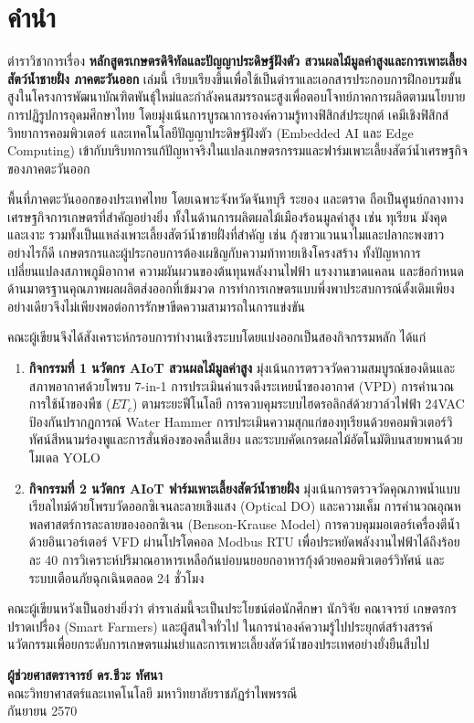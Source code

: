 \chapter*{คำนำ}

ตำราวิชาการเรื่อง \textbf{หลักสูตรเกษตรดิจิทัลและปัญญาประดิษฐ์ฝังตัว สวนผลไม้มูลค่าสูงและการเพาะเลี้ยงสัตว์น้ำชายฝั่ง ภาคตะวันออก} เล่มนี้ เรียบเรียงขึ้นเพื่อใช้เป็นตำราและเอกสารประกอบการฝึกอบรมขั้นสูงในโครงการพัฒนาบัณฑิตพันธุ์ใหม่และกำลังคนสมรรถนะสูงเพื่อตอบโจทย์ภาคการผลิตตามนโยบายการปฏิรูปการอุดมศึกษาไทย โดยมุ่งเน้นการบูรณาการองค์ความรู้ทางฟิสิกส์ประยุกต์ เคมีเชิงฟิสิกส์ วิทยาการคอมพิวเตอร์ และเทคโนโลยีปัญญาประดิษฐ์ฝังตัว (Embedded AI และ Edge Computing) เข้ากับบริบทการแก้ปัญหาจริงในแปลงเกษตรกรรมและฟาร์มเพาะเลี้ยงสัตว์น้ำเศรษฐกิจของภาคตะวันออก

พื้นที่ภาคตะวันออกของประเทศไทย โดยเฉพาะจังหวัดจันทบุรี ระยอง และตราด ถือเป็นศูนย์กลางทางเศรษฐกิจการเกษตรที่สำคัญอย่างยิ่ง ทั้งในด้านการผลิตผลไม้เมืองร้อนมูลค่าสูง เช่น ทุเรียน มังคุด และเงาะ รวมทั้งเป็นแหล่งเพาะเลี้ยงสัตว์น้ำชายฝั่งที่สำคัญ เช่น กุ้งขาวแวนนาไมและปลากะพงขาว อย่างไรก็ดี เกษตรกรและผู้ประกอบการต้องเผชิญกับความท้าทายเชิงโครงสร้าง ทั้งปัญหาการเปลี่ยนแปลงสภาพภูมิอากาศ ความผันผวนของต้นทุนพลังงานไฟฟ้า แรงงานขาดแคลน และข้อกำหนดด้านมาตรฐานคุณภาพผลผลิตส่งออกที่เข้มงวด การทำการเกษตรแบบพึ่งพาประสบการณ์ดั้งเดิมเพียงอย่างเดียวจึงไม่เพียงพอต่อการรักษาขีดความสามารถในการแข่งขัน

คณะผู้เขียนจึงได้สังเคราะห์กรอบการทำงานเชิงระบบโดยแบ่งออกเป็นสองกิจกรรมหลัก ได้แก่
\begin{enumerate}
    \item \textbf{กิจกรรมที่ 1 นวัตกร AIoT สวนผลไม้มูลค่าสูง} มุ่งเน้นการตรวจวัดความสมบูรณ์ของดินและสภาพอากาศด้วยโพรบ 7-in-1 การประเมินค่าแรงดึงระเหยน้ำของอากาศ (VPD) การคำนวณการใช้น้ำของพืช ($ET_c$) ตามระยะฟีโนโลยี การควบคุมระบบไฮดรอลิกส์ด้วยวาล์วไฟฟ้า 24VAC ป้องกันปรากฏการณ์ Water Hammer การประเมินความสุกแก่ของทุเรียนด้วยคอมพิวเตอร์วิทัศน์สีหนามร่องพูและการสั่นพ้องของคลื่นเสียง และระบบคัดเกรดผลไม้อัตโนมัติบนสายพานด้วยโมเดล YOLO
    \item \textbf{กิจกรรมที่ 2 นวัตกร AIoT ฟาร์มเพาะเลี้ยงสัตว์น้ำชายฝั่ง} มุ่งเน้นการตรวจวัดคุณภาพน้ำแบบเรียลไทม์ด้วยโพรบวัดออกซิเจนละลายเชิงแสง (Optical DO) และความเค็ม การคำนวณอุณหพลศาสตร์การละลายของออกซิเจน (Benson-Krause Model) การควบคุมมอเตอร์เครื่องตีน้ำด้วยอินเวอร์เตอร์ VFD ผ่านโปรโตคอล Modbus RTU เพื่อประหยัดพลังงานไฟฟ้าได้ถึงร้อยละ 40 การวิเคราะห์ปริมาณอาหารเหลือก้นบ่อบนยอยกอาหารกุ้งด้วยคอมพิวเตอร์วิทัศน์ และระบบเตือนภัยฉุกเฉินตลอด 24 ชั่วโมง
\end{enumerate}

คณะผู้เขียนหวังเป็นอย่างยิ่งว่า ตำราเล่มนี้จะเป็นประโยชน์ต่อนักศึกษา นักวิจัย คณาจารย์ เกษตรกรปราดเปรื่อง (Smart Farmers) และผู้สนใจทั่วไป ในการนำองค์ความรู้ไปประยุกต์สร้างสรรค์นวัตกรรมเพื่อยกระดับการเกษตรแม่นยำและการเพาะเลี้ยงสัตว์น้ำของประเทศอย่างยั่งยืนสืบไป

\vspace{1.5cm}
\begin{flushright}
    \textbf{ผู้ช่วยศาสตราจารย์ ดร.ชีวะ ทัศนา}\\
    คณะวิทยาศาสตร์และเทคโนโลยี มหาวิทยาลัยราชภัฏรำไพพรรณี\\
    กันยายน 2570
\end{flushright}
\clearpage
